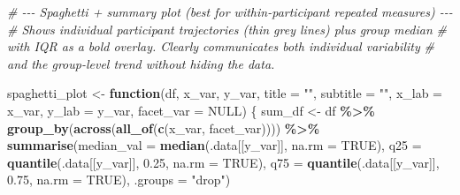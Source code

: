 \documentclass[
]{article}
\newenvironment{Shaded}{\begin{snugshade}}{\end{snugshade}}
\newcommand{\AttributeTok}[1]{\textcolor[rgb]{0.13,0.29,0.53}{#1}}
\newcommand{\CommentTok}[1]{\textcolor[rgb]{0.56,0.35,0.01}{\textit{#1}}}
\newcommand{\ConstantTok}[1]{\textcolor[rgb]{0.56,0.35,0.01}{#1}}
\newcommand{\ControlFlowTok}[1]{\textcolor[rgb]{0.13,0.29,0.53}{\textbf{#1}}}
\newcommand{\FloatTok}[1]{\textcolor[rgb]{0.00,0.00,0.81}{#1}}
\newcommand{\FunctionTok}[1]{\textcolor[rgb]{0.13,0.29,0.53}{\textbf{#1}}}
\newcommand{\NormalTok}[1]{#1}
\newcommand{\OtherTok}[1]{\textcolor[rgb]{0.56,0.35,0.01}{#1}}
\newcommand{\SpecialCharTok}[1]{\textcolor[rgb]{0.81,0.36,0.00}{\textbf{#1}}}
\newcommand{\StringTok}[1]{\textcolor[rgb]{0.31,0.60,0.02}{#1}}
\begin{document}
\begin{Shaded}
\begin{Highlighting}[]
\CommentTok{\# {-}{-}{-} Spaghetti + summary plot (best for within{-}participant repeated measures) {-}{-}{-}}
\CommentTok{\# Shows individual participant trajectories (thin grey lines) plus group median}
\CommentTok{\# with IQR as a bold overlay. Clearly communicates both individual variability}
\CommentTok{\# and the group{-}level trend without hiding the data.}

\NormalTok{spaghetti\_plot }\OtherTok{\textless{}{-}} \ControlFlowTok{function}\NormalTok{(df, x\_var, y\_var,}
                            \AttributeTok{title =} \StringTok{""}\NormalTok{, }\AttributeTok{subtitle =} \StringTok{""}\NormalTok{,}
                            \AttributeTok{x\_lab =}\NormalTok{ x\_var, }\AttributeTok{y\_lab =}\NormalTok{ y\_var,}
                            \AttributeTok{facet\_var =} \ConstantTok{NULL}\NormalTok{) \{}
\NormalTok{  sum\_df }\OtherTok{\textless{}{-}}\NormalTok{ df }\SpecialCharTok{\%\textgreater{}\%}
    \FunctionTok{group\_by}\NormalTok{(}\FunctionTok{across}\NormalTok{(}\FunctionTok{all\_of}\NormalTok{(}\FunctionTok{c}\NormalTok{(x\_var, facet\_var)))) }\SpecialCharTok{\%\textgreater{}\%}
    \FunctionTok{summarise}\NormalTok{(}\AttributeTok{median\_val =} \FunctionTok{median}\NormalTok{(.data[[y\_var]], }\AttributeTok{na.rm =} \ConstantTok{TRUE}\NormalTok{),}
              \AttributeTok{q25        =} \FunctionTok{quantile}\NormalTok{(.data[[y\_var]], }\FloatTok{0.25}\NormalTok{, }\AttributeTok{na.rm =} \ConstantTok{TRUE}\NormalTok{),}
              \AttributeTok{q75        =} \FunctionTok{quantile}\NormalTok{(.data[[y\_var]], }\FloatTok{0.75}\NormalTok{, }\AttributeTok{na.rm =} \ConstantTok{TRUE}\NormalTok{),}
              \AttributeTok{.groups    =} \StringTok{"drop"}\NormalTok{)}


\end{Highlighting}
\end{Shaded}
\end{document}
